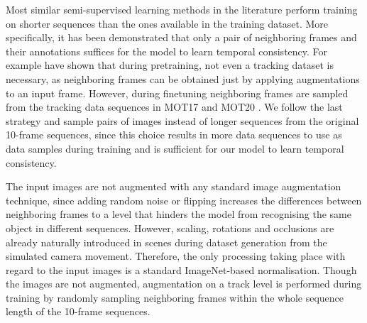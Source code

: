 Most similar semi-supervised learning methods in the literature perform training on shorter sequences than the ones available in the training dataset. More specifically, it has been demonstrated that only a pair of neighboring frames and their annotations suffices for the model to learn temporal consistency.
For example \parencite{meinhardt2021trackformer} have shown that during pretraining, not even a tracking dataset is necessary, as neighboring frames can be obtained just by applying augmentations to an input frame. However, during finetuning neighboring frames are sampled from the tracking data sequences in MOT17 \parencite{mot17} and MOT20 \parencite{mot20}.
We follow the last strategy and sample pairs of images instead of longer sequences from the original 10-frame sequences, since this choice results in more data sequences to use as data samples during training and is sufficient for our model to learn temporal consistency. \par 

The input images are not augmented with any standard image augmentation technique, since adding random noise or flipping increases the differences between neighboring frames to a level that hinders the model from recognising the same object in different sequences. However, scaling, rotations and occlusions are already naturally introduced in scenes during dataset generation from the simulated camera movement. Therefore, the only processing taking place with regard to the input images is a standard ImageNet-based normalisation. Though the images are not augmented, augmentation on a track level is performed during training by randomly sampling neighboring frames within the whole sequence length of the 10-frame sequences. \par

\vspace{12mm}

